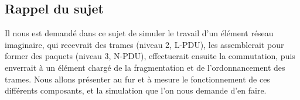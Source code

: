 \documentclass[a4paper,11pt]{article}
\begin{document}
\subsection{Rappel du sujet}

Il nous est demandé dans ce sujet de simuler le travail d’un élément réseau imaginaire, qui recevrait des trames (niveau 2, L-PDU), les assemblerait pour former des paquets (niveau 3, N-PDU), effectuerait ensuite la commutation, puis enverrait à un élément chargé de la fragmentation et de l’ordonnancement des trames. Nous allons présenter au fur et à mesure le fonctionnement de ces différents composants, et la simulation que l'on nous demande d’en faire.



% 
% 
% 
\end{document}
